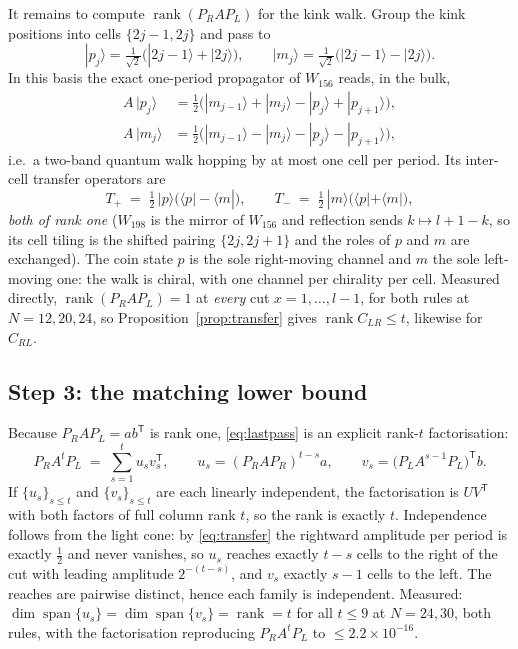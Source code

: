 \documentclass[11pt]{article}
\theoremstyle{plain}
\theoremstyle{remark}
\begin{document}
It remains to compute $\operatorname{rank}(P_RAP_L)$ for the kink walk. Group
the kink positions into cells $\{2j-1,2j\}$ and pass to
\[
  |p_j\rangle = \tfrac1{\sqrt2}\big(|2j-1\rangle + |2j\rangle\big),
  \qquad
  |m_j\rangle = \tfrac1{\sqrt2}\big(|2j-1\rangle - |2j\rangle\big).
\]
In this basis the exact one-period propagator of $W_{156}$ reads, in the bulk,
\begin{align}
  A\,|p_j\rangle &= \tfrac12\big(|m_{j-1}\rangle + |m_j\rangle
    - |p_j\rangle + |p_{j+1}\rangle\big), \nonumber\\
  A\,|m_j\rangle &= \tfrac12\big(|m_{j-1}\rangle - |m_j\rangle
    - |p_j\rangle - |p_{j+1}\rangle\big),
  \label{eq:cellwalk}
\end{align}
i.e.\ a two-band quantum walk hopping by at most one cell per period. Its
inter-cell transfer operators are
\begin{equation}
  T_+ \;=\; \tfrac12\,|p\rangle\big(\langle p| - \langle m|\big),
  \qquad
  T_- \;=\; \tfrac12\,|m\rangle\big(\langle p| + \langle m|\big),
  \label{eq:transfer}
\end{equation}
\emph{both of rank one} ($W_{198}$ is the mirror of $W_{156}$ and reflection
sends $k\mapsto l+1-k$, so its cell tiling is the shifted pairing
$\{2j,2j+1\}$ and the roles of $p$ and $m$ are exchanged).
The coin state $p$ is the sole right-moving channel and $m$ the sole left-moving
one: the walk is chiral, with one channel per chirality per cell. Measured
directly, $\operatorname{rank}(P_RAP_L) = 1$ at \emph{every} cut
$x=1,\dots,l-1$, for both rules at $N=12,20,24$, so
Proposition~\ref{prop:transfer} gives
$\operatorname{rank}C_{LR}\le t$, likewise for $C_{RL}$.

\subsection{Step 3: the matching lower bound}

Because $P_RAP_L = ab^{\mathsf T}$ is rank one, \eqref{eq:lastpass} is an
explicit rank-$t$ factorisation:
\[
  P_R A^t P_L \;=\; \sum_{s=1}^{t} u_s v_s^{\mathsf T},
  \qquad
  u_s = (P_RAP_R)^{t-s} a, \qquad
  v_s = \big(P_L A^{s-1} P_L\big)^{\mathsf T} b .
\]
If $\{u_s\}_{s\le t}$ and $\{v_s\}_{s\le t}$ are each linearly independent, the
factorisation is $UV^{\mathsf T}$ with both factors of full column rank $t$, so
the rank is exactly $t$. Independence follows from the light cone: by
\eqref{eq:transfer} the rightward amplitude per period is exactly $\tfrac12$ and
never vanishes, so $u_s$ reaches exactly $t-s$ cells to the right of the cut
with leading amplitude $2^{-(t-s)}$, and $v_s$ exactly $s-1$ cells to the left.
The reaches are pairwise distinct, hence each family is independent. Measured:
$\dim\operatorname{span}\{u_s\} = \dim\operatorname{span}\{v_s\}
= \operatorname{rank} = t$ for all $t\le 9$ at $N=24,30$, both rules, with the
factorisation reproducing $P_RA^tP_L$ to $\le2.2\times10^{-16}$.
\end{document}
